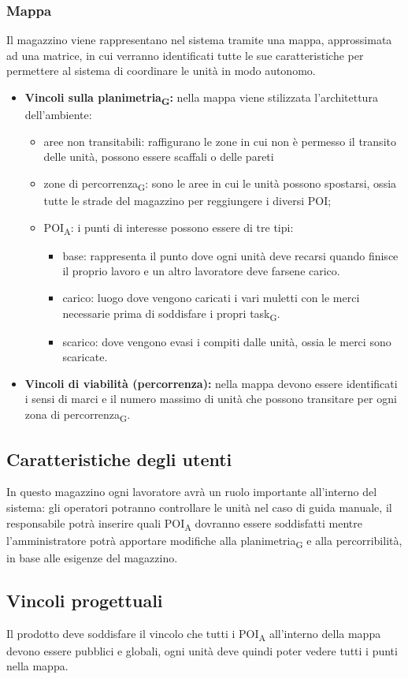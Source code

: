 \subsubsection{Mappa}
Il magazzino viene rappresentano nel sistema tramite una mappa, approssimata ad una matrice, in cui verranno identificati tutte le sue caratteristiche per permettere al sistema di coordinare le unità in modo autonomo.
\begin{itemize}
	\item \textbf{Vincoli sulla \gls{planimetria}\textsubscript{G}:} nella mappa viene stilizzata l'architettura dell'ambiente:
	\begin{itemize}
		\item aree non transitabili: raffigurano le zone in cui non è permesso il transito delle unità, possono essere scaffali o delle pareti
		\item zone di \gls{percorrenza}\textsubscript{G}: sono le aree in cui le unità possono spostarsi, ossia tutte le strade del magazzino per reggiungere i diversi POI;
		\item \acrshort{POI}\textsubscript{A}: i punti di interesse possono essere di tre tipi:
		\begin{itemize}
			\item base: rappresenta il punto dove ogni unità deve recarsi quando finisce il proprio lavoro e un altro lavoratore deve farsene carico.
			\item carico: luogo dove vengono caricati i vari muletti con le merci necessarie prima di soddisfare i propri \gls{task}\textsubscript{G}.
			\item scarico: dove vengono evasi i compiti dalle unità, ossia le merci sono scaricate.
		\end{itemize}
	\end{itemize}
	\item \textbf{Vincoli di viabilità (percorrenza):} nella mappa devono essere identificati i sensi di marci e il numero massimo di unità che possono transitare per ogni zona di \gls{percorrenza}\textsubscript{G}.
	
\end{itemize}

\subsection{Caratteristiche degli utenti}
In questo magazzino ogni lavoratore avrà un ruolo importante all'interno del sistema: gli operatori potranno controllare le unità nel caso di guida manuale, il responsabile potrà inserire quali \acrshort{POI}\textsubscript{A} dovranno essere soddisfatti mentre l'amministratore potrà apportare modifiche alla \gls{planimetria}\textsubscript{G} e alla percorribilità, in base alle esigenze del magazzino.
\subsection{Vincoli progettuali}
Il prodotto deve soddisfare il vincolo che tutti i \acrshort{POI}\textsubscript{A} all'interno della mappa devono essere pubblici e globali, ogni unità deve quindi poter vedere tutti i punti nella mappa.